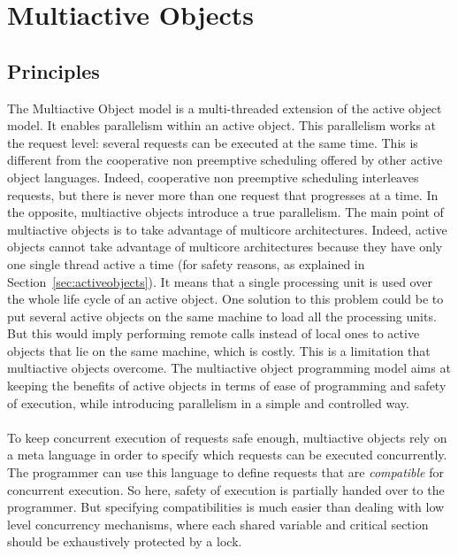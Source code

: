 \documentclass[11pt]{report}
\begin{document}
\section{Multiactive Objects}
\subsection{Principles}\label{sec:MAOprinciples}
The Multiactive Object model \cite{ref:mao} is a multi-threaded extension of the active object model. It enables parallelism within an active object. This parallelism works at the request level: several requests can be executed at the same time. This is different from the cooperative non preemptive scheduling offered by other active object languages. Indeed, cooperative non preemptive scheduling interleaves requests, but there is never more than one request that progresses at a time. In the opposite, multiactive objects introduce a true parallelism. The main point of multiactive objects is to take advantage of multicore architectures. Indeed, active objects cannot take advantage of multicore architectures because they have only one single thread active a time (for safety reasons, as explained in Section~\ref{sec:activeobjects}). It means that a single processing unit is used over the whole life cycle of an active object. One solution to this problem could be to put several active objects on the same machine to load all the processing units. But this would imply performing remote calls instead of local ones to active objects that lie on the same machine, which is costly. This is a limitation that multiactive objects overcome.
The multiactive object programming model aims at keeping the benefits of active objects in terms of ease of programming and safety of execution, while introducing parallelism in a simple and controlled way. 

\paragraph{}
To keep concurrent execution of requests safe enough, multiactive objects rely on a meta language in order to specify which requests can be executed concurrently. The programmer can use this language to define requests that are \emph{compatible} for concurrent execution. So here, safety of execution is partially handed over to the programmer. But specifying compatibilities is much easier than dealing with low level concurrency mechanisms, where each shared variable and critical section should be exhaustively protected by a lock.
\end{document}
